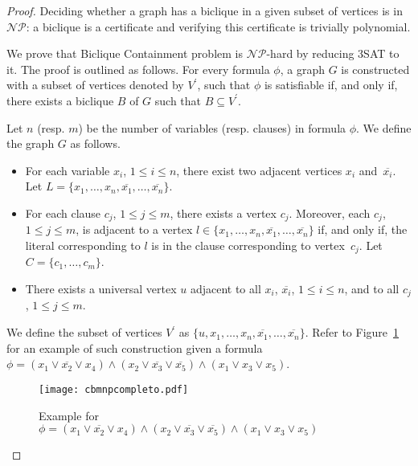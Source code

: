 \documentclass{article}
\begin{document}
\begin{proof}
Deciding whether a graph has a biclique in a given
subset of vertices is in $\mathcal{NP}$: a biclique is a
certificate and verifying this certificate is trivially polynomial.

We prove that {\sc Biclique Containment} problem is $\mathcal{NP}$-hard by
reducing {\sc 3SAT} to it. The proof is outlined as follows. For every formula
$\phi$, a graph $G$ is constructed with a subset of vertices denoted by
$V^\prime$, such that $\phi$ is satisfiable if, and only if, there exists a
biclique $B$ of $G$ such that $B \subseteq V^\prime$.

	Let $n$ (resp. $m$) be the number of variables (resp. clauses) in formula
	$\phi$. We define the graph $G$ as follows.
	
	\begin{itemize}
		\item For each variable $x_{i}$, $1 \leq i \leq n$, there exist two adjacent
		vertices $x_{i}$ and~$\overline{x_{i}}$. Let $L = \{x_{1}, \dots, x_{n},
		\overline{x_{1}}, \dots, \overline{x_{n}}\}$.
		\item For each clause $c_{j}$, $1 \leq j \leq m$, there exists a vertex 
		$c_{j}$. Moreover, each $c_{j}$, $1 \leq j \leq m$, is adjacent to a vertex $l
		\in \{ x_{1}, \dots, x_{n}, \overline{x_{1}}, \dots, \overline{x_{n}}\}$
		if, and only if, the literal corresponding to $l$ is in the clause
		corresponding to vertex~$c_{j}$. Let $C = \{c_1, \ldots, c_m\}$.
		\item There exists a universal vertex $u$ adjacent to all $x_{i}$,
		$\overline{x_{i}}$, $1 \leq i \leq n$, and to all $c_j$, $1 \leq j \leq m$.
		
	\end{itemize}
	
	We define the subset of vertices $V^\prime$ as $\{u, x_{1}, \dots, x_{n},
	\overline{x_{1}}, \dots, \overline{x_{n}}\}$. Refer to 
	Figure~\ref{fig:cbmnpcompleto} for an example of such construction given a
	formula $\phi = ( x_{1} \vee \overline{x_{2}} \vee x_{4}) \wedge 
	( x_{2} \vee \overline{x_{3}} \vee \overline{x_{5}} )\wedge ( x_{1} \vee
	x_{3} \vee x_{5})$.

\begin{figure}[h]
\center
	\texttt{[image: cbmnpcompleto.pdf]}
	\caption{Example for $\phi = ( x_{1} \vee \overline{x_{2}} \vee x_{4}) \wedge 
	( x_{2} \vee \overline{x_{3}} \vee \overline{x_{5}} )\wedge ( x_{1} \vee
	x_{3} \vee x_{5})$ }
	\label{fig:cbmnpcompleto}
\end{figure}
	

\end{proof}
\end{document}
